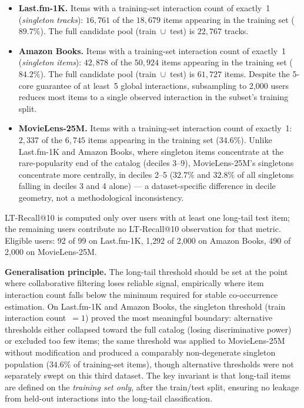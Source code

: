 \documentclass[11pt,a4paper]{article}
\begin{document}
\begin{itemize}[leftmargin=*, itemsep=3pt]
  \item \textbf{Last.fm-1K.} Items with a training-set interaction count of
        exactly~1 (\emph{singleton tracks}): $16{,}761$ of the $18{,}679$
        items appearing in the training set ($89.7\%$). The full candidate
        pool (train~$\cup$~test) is $22{,}767$ tracks.
  \item \textbf{Amazon Books.} Items with a training-set interaction count of
        exactly~1 (\emph{singleton items}): $42{,}878$ of the $50{,}924$
        items appearing in the training set ($84.2\%$). The full candidate
        pool (train~$\cup$~test) is $61{,}727$ items. Despite the 5-core
        guarantee of at least~5 global interactions, subsampling to
        2{,}000 users reduces most items to a single observed interaction
        in the subset's training split.
  \item \textbf{MovieLens-25M.} Items with a training-set interaction count
        of exactly~1: $2{,}337$ of the $6{,}745$ items appearing in the
        training set ($34.6\%$). Unlike Last.fm-1K and Amazon Books, where
        singleton items concentrate at the rare-popularity end of the
        catalog (deciles 3--9), MovieLens-25M's singletons concentrate more
        centrally, in deciles 2--5 ($32.7\%$ and $32.8\%$ of all singletons
        falling in deciles 3 and 4 alone) --- a dataset-specific difference
        in decile geometry, not a methodological inconsistency.
\end{itemize}

LT-Recall@10 is computed only over users with at least one long-tail test
item; the remaining users contribute no LT-Recall@10 observation for that
metric. Eligible users: 92 of 99 on Last.fm-1K, 1{,}292 of 2{,}000 on
Amazon Books, 490 of 2{,}000 on MovieLens-25M.

\textbf{Generalisation principle.} The long-tail threshold should be set at
the point where collaborative filtering loses reliable signal, empirically
where item interaction count falls below the minimum required for stable
co-occurrence estimation. On Last.fm-1K and Amazon Books, the singleton
threshold (train interaction count~$= 1$) proved the most meaningful
boundary: alternative thresholds either collapsed toward the full catalog
(losing discriminative power) or excluded too few items; the same
threshold was applied to MovieLens-25M without modification and produced
a comparably non-degenerate singleton population ($34.6\%$ of training-set
items), though alternative thresholds were not separately swept on this
third dataset. The key invariant
is that long-tail items are defined on the \emph{training set only}, after
the train/test split, ensuring no leakage from held-out interactions into the
long-tail classification.
\end{document}
